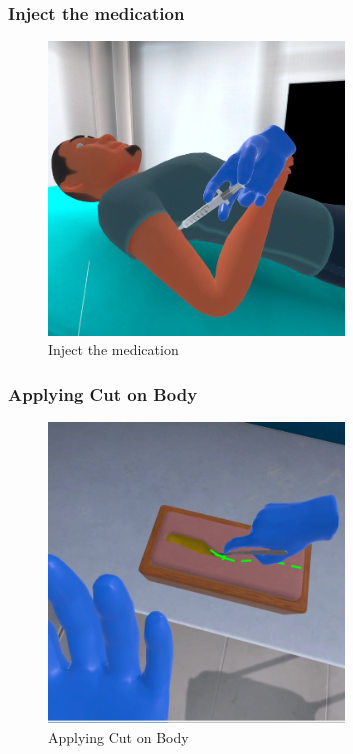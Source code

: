 \subsubsection{Inject the medication}
\begin{figure}[h]
	\centering
	\includegraphics[width=0.7\textwidth, height=0.3\textheight]{Images/Inject the medication.png}
	\caption{Inject the medication}
	\label{fig:Inject the medication}
\end{figure}
\newpage
\subsubsection{Applying Cut on Body}
\begin{figure}[h]
	\centering
	\includegraphics[width=0.7\textwidth, height=0.3\textheight]{Images/Applying Cut on Body.png}
	\caption{Applying Cut on Body}
	\label{fig:Applying Cut on Body}
\end{figure}
